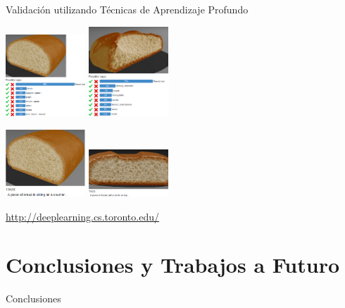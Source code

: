 \documentclass[spanish,unknownkeysallowed,10pt]{beamer}
\begin{document}
\begin{frame}{Validación utilizando Técnicas de Aprendizaje Profundo}




\centering
\includegraphics[width=3cm]{../figures/deep1}
\includegraphics[width=3cm]{../figures/deep4}

\includegraphics[width=3cm]{../figures/deep2}
\includegraphics[width=3cm]{../figures/deep3}


\vspace{0.4cm}
\url{http://deeplearning.cs.toronto.edu/}

\end{frame}



\section[Conclusiones]{Conclusiones y Trabajos a Futuro}


\begin{frame}
\begin{block}{}
\begin{center}
\vspace{1cm}
\huge{Conclusiones}
\vspace{1cm}
\end{center}
\end{block}
\end{frame}
\end{document}
